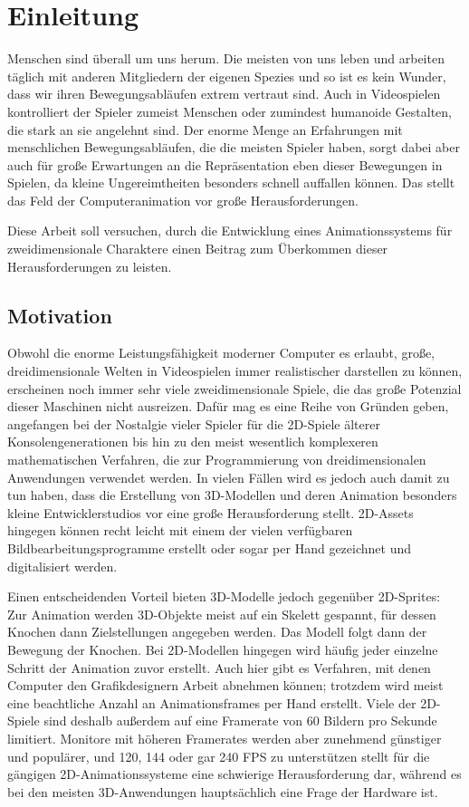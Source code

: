 \chapter{Einleitung}
Menschen sind überall um uns herum. Die meisten von uns leben und arbeiten täglich mit anderen Mitgliedern der eigenen Spezies und so ist es kein Wunder, dass wir ihren Bewegungsabläufen extrem vertraut sind. Auch in Videospielen kontrolliert der Spieler zumeist Menschen oder zumindest humanoide Gestalten, die stark an sie angelehnt sind. Der enorme Menge an Erfahrungen mit menschlichen Bewegungsabläufen, die die meisten Spieler haben, sorgt dabei aber auch für große Erwartungen an die Repräsentation eben dieser Bewegungen in Spielen, da kleine Ungereimtheiten besonders schnell auffallen können. Das stellt das Feld der Computeranimation vor große Herausforderungen.

Diese Arbeit soll versuchen, durch die Entwicklung eines Animationssystems für zweidimensionale Charaktere einen Beitrag zum Überkommen dieser Herausforderungen zu leisten.

\section{Motivation}
Obwohl die enorme Leistungsfähigkeit moderner Computer es erlaubt, große, dreidimensionale Welten in Videospielen immer realistischer darstellen zu können, erscheinen noch immer sehr viele zweidimensionale Spiele, die das große Potenzial dieser Maschinen nicht ausreizen. Dafür mag es eine Reihe von Gründen geben, angefangen bei der Nostalgie vieler Spieler für die 2D-Spiele älterer Konsolengenerationen bis hin zu den meist wesentlich komplexeren mathematischen Verfahren, die zur Programmierung von dreidimensionalen Anwendungen verwendet werden. In vielen Fällen wird es jedoch auch damit zu tun haben, dass die Erstellung von 3D-Modellen und deren Animation besonders kleine Entwicklerstudios vor eine große Herausforderung stellt. 2D-Assets hingegen können recht leicht mit einem der vielen verfügbaren Bildbearbeitungsprogramme erstellt oder sogar per Hand gezeichnet und digitalisiert werden.

Einen entscheidenden Vorteil bieten 3D-Modelle jedoch gegenüber 2D-Sprites: Zur Animation werden 3D-Objekte meist auf ein Skelett gespannt, für dessen Knochen dann Zielstellungen angegeben werden. Das Modell folgt dann der Bewegung der Knochen. Bei 2D-Modellen hingegen wird häufig jeder einzelne Schritt der Animation zuvor erstellt. Auch hier gibt es Verfahren, mit denen Computer den Grafikdesignern Arbeit abnehmen können; trotzdem wird meist eine beachtliche Anzahl an Animationsframes per Hand erstellt. Viele der 2D-Spiele sind deshalb außerdem auf eine Framerate von 60 Bildern pro Sekunde limitiert. Monitore mit höheren Framerates werden aber zunehmend günstiger und populärer, und 120, 144 oder gar 240 FPS zu unterstützen stellt für die gängigen 2D-Animationssysteme eine schwierige Herausforderung dar, während es bei den meisten 3D-Anwendungen hauptsächlich eine Frage der Hardware ist.

